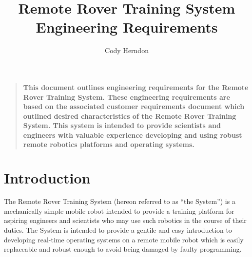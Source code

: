 \documentclass[12pt]{article}
\title{Remote Rover Training System\\Engineering Requirements}
\author{Cody Herndon}
\date{}
\newenvironment{sciabstract}{%
\begin{quote} \bf}
{\end{quote}}
\begin{document}
 


\baselineskip24pt


\maketitle 




\begin{sciabstract}
  This document outlines engineering requirements for the Remote Rover Training System.  These engineering requirements are based on the associated customer requirements document which outlined desired characteristics of the Remote Rover Training System.  This system is intended to provide scientists and engineers with valuable experience developing and using robust remote robotics platforms and operating systems.
\end{sciabstract}


\section{Introduction}
The Remote Rover Training System (hereon referred to as ``the System'') is a mechanically simple mobile robot intended to provide a training platform for aspiring engineers and scientists who may use such robotics in the course of their duties.  The System is intended to provide a gentile and easy introduction to developing real-time operating systems on a remote mobile robot which is easily replaceable and robust enough to avoid being damaged by faulty programming.
\end{document}
